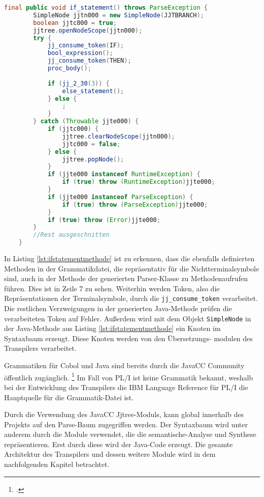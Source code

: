 \begin{lstlisting}[language=Java, caption=Syntaxregel für Verzweigungen als Java-Methode, label={lst:ifstatementmethode}]
	final public void if_statement() throws ParseException {
		SimpleNode jjtn000 = new SimpleNode(JJTBRANCH);
		boolean jjtc000 = true;
		jjtree.openNodeScope(jjtn000);
		try {
			jj_consume_token(IF);
			bool_expression();
			jj_consume_token(THEN);
			proc_body();
			
			if (jj_2_30(3)) {
				else_statement();
			} else {
				;
			}
		} catch (Throwable jjte000) {
			if (jjtc000) {
				jjtree.clearNodeScope(jjtn000);
				jjtc000 = false;
			} else {
				jjtree.popNode();
			}
			if (jjte000 instanceof RuntimeException) {
				if (true) throw (RuntimeException)jjte000;
			}
			if (jjte000 instanceof ParseException) {
				if (true) throw (ParseException)jjte000;
			}
			if (true) throw (Error)jjte000;
		}
		//Rest ausgeschnitten
	}	
\end{lstlisting}

In Listing \ref{lst:ifstatementmethode} ist zu erkennen, dass die ebenfalls definierten Methoden in der Grammatikdatei, die repräsentativ für die Nichtterminalsymbole sind, auch in der Methode der generierten Parser-Klasse zu Methodenaufrufen führen. Dies ist in Zeile 7 zu sehen. Weiterhin werden Token, also die Repräsentationen der Terminalsymbole, durch die \verb+jj_consume_token+ verarbeitet. Die restlichen Verzweigungen in der generierten Java-Methode prüfen die verarbeiteten Token auf Fehler. Außerdem wird mit dem Objekt \verb+SimpleNode+ in der Java-Methode aus Listing \ref{lst:ifstatementmethode} ein Knoten im Syntaxbaum erzeugt. Diese Knoten werden von den Übersetzungs- \newline modulen des Transpilers verarbeitet.

\pagebreak
Grammatiken für Cobol und Java sind bereits durch die JavaCC Community öffentlich zugänglich. \footcite[Vgl. ][]{javaccdoku}
Im Fall von PL/I ist keine Grammatik bekannt, weshalb bei der Entwicklung des Transpilers die IBM Language Reference für PL/I die Hauptquelle für die Grammatik-Datei ist.   

Durch die Verwendung des JavaCC Jjtree-Moduls, kann global innerhalb des Projekts auf den Parse-Baum zugegriffen werden. 
Der Syntaxbaum wird unter anderem durch die Module verwendet, die die semantische-Analyse und Synthese repräsentieren.
Erst durch diese wird der Java-Code erzeugt.
Die gesamte Architektur des Transpilers und dessen weitere Module wird in dem nachfolgenden Kapitel betrachtet. 
\pagebreak
